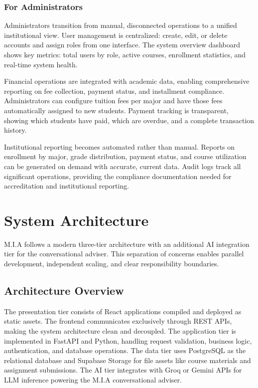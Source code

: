 \documentclass[12pt,a4paper]{report}
\begin{document}
\subsection{For Administrators}

Administrators transition from manual, disconnected operations to a unified institutional view. User management is centralized: create, edit, or delete accounts and assign roles from one interface. The system overview dashboard shows key metrics: total users by role, active courses, enrollment statistics, and real-time system health.

Financial operations are integrated with academic data, enabling comprehensive reporting on fee collection, payment status, and installment compliance. Administrators can configure tuition fees per major and have those fees automatically assigned to new students. Payment tracking is transparent, showing which students have paid, which are overdue, and a complete transaction history.

Institutional reporting becomes automated rather than manual. Reports on enrollment by major, grade distribution, payment status, and course utilization can be generated on demand with accurate, current data. Audit logs track all significant operations, providing the compliance documentation needed for accreditation and institutional reporting.

\chapter{System Architecture}

M.I.A follows a modern three-tier architecture with an additional AI integration tier for the conversational adviser. This separation of concerns enables parallel development, independent scaling, and clear responsibility boundaries.

\section{Architecture Overview}

The presentation tier consists of React applications compiled and deployed as static assets. The frontend communicates exclusively through REST APIs, making the system architecture clean and decoupled. The application tier is implemented in FastAPI and Python, handling request validation, business logic, authentication, and database operations. The data tier uses PostgreSQL as the relational database and Supabase Storage for file assets like course materials and assignment submissions. The AI tier integrates with Groq or Gemini APIs for LLM inference powering the M.I.A conversational adviser.
\end{document}
